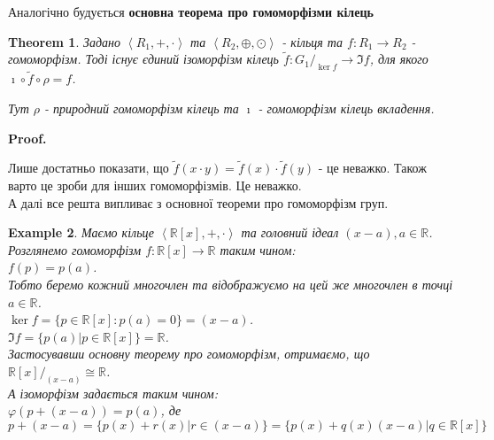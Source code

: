 \documentclass[a4paper, 10pt]{article}
\makeatletter
\theoremstyle{theoremdd}
\newtheorem{theorem}{Theorem}[subsection]
\theoremstyle{theoremdd}
\theoremstyle{theoremdd}
\theoremstyle{theoremdd}
\theoremstyle{theoremdd}
\newtheorem{example}[theorem]{Example}
\theoremstyle{theoremdd}
\theoremstyle{theoremdd}
\theoremstyle{theoremdd}
\theoremstyle{theoremdd}
\theoremstyle{theoremdd}
\theoremstyle{theoremdd}
\theoremstyle{theoremdd}
\theoremstyle{theoremdd}
\theoremstyle{theoremdd}
\theoremstyle{theoremdd}
\renewenvironment{proof}[1][Proof.\\]{\par
\pushQED{\hfill \qed}%
\normalfont \topsep6\p@\@plus6\p@\relax
\trivlist
\item\relax
{\bfseries
#1\@addpunct{.}}\hspace\labelsep\ignorespaces
}{%
\popQED\endtrivlist\@endpefalse
}
\makeatother
\begin{document}
Аналогічно будується \textbf{основна теорема про гомоморфізми кілець}
\iffalse
\begin{theorem}
Задано $\left<R_1, +, \cdot \right>$ та $\left<R_2, \oplus, \odot \right>$ - кільця та $f: R_1 \to R_2$ - гомоморфізм. Тоді:\\
1. $\left<R_1/_{\ker f},+,\cdot \right> \cong \left< \Im f, \oplus, \odotо\right>$.\\
2. Ізоморфізм $\varphi: R_1/_{\ker f} \to \Im f$ буде такий, що $\varphi \circ \rho = f$, де\\
$\rho: R_1 \to R_1/_{\ker f}$ - природний гомоморфізм кілець. Ізоморфізм $\varphi$ єдиний.
\end{theorem}
\fi

\begin{theorem}
Задано $\left<R_1, +, \cdot \right>$ та $\left<R_2, \oplus, \odot \right>$ - кільця та $f: R_1 \to R_2$ - гомоморфізм. Тоді існує єдиний ізоморфізм кілець $\tilde{f} \colon G_1/_{\ker f} \to \Im f$, для якого $\imath \circ \tilde{f} \circ \rho = f$.
\begin{figure}[H]
\centering
{}
\end{figure}
Тут $\rho$ - природний гомоморфізм кілець та $\imath$ - гомоморфізм кілець вкладення.
\end{theorem}

\begin{proof}
Лише достатньо показати, що $\tilde{f}(x \cdot y) = \tilde{f}(x) \cdot \tilde{f}(y)$ - це неважко. Також варто це зроби для інших гомоморфізмів. Це неважко.\\
А далі все решта випливає з основної теореми про гомоморфізм груп.
\end{proof}

\begin{example}
Маємо кільце $\left< \mathbb{R}[x],+,\cdot \right>$ та головний ідеал $(x-a), a \in \mathbb{R}$. Розглянемо гомоморфізм $f: \mathbb{R}[x] \to \mathbb{R}$ таким чином:\\
$f(p) = p(a)$.\\
Тобто беремо кожний многочлен та відображуємо на цей же многочлен в точці $a \in \mathbb{R}$.\\
$\ker f = \{ p \in \mathbb{R}[x]: p(a) = 0 \} = (x-a)$.\\
$\Im f = \{ p(a) | p \in \mathbb{R}[x] \} = \mathbb{R}$.\\
Застосувавши основну теорему про гомоморфізм, отримаємо, що \\ $\mathbb{R}[x]/_{(x-a)} \cong \mathbb{R}$.\\
А ізоморфізм задається таким чином:\\
$\varphi(p + (x-a)) = p(a)$, де\\
$p + (x-a) = \{p(x) + r(x) | r \in (x-a)\} = \{p(x) + q(x)(x-a) | q \in \mathbb{R}[x] \}$
\end{example}
\end{document}
